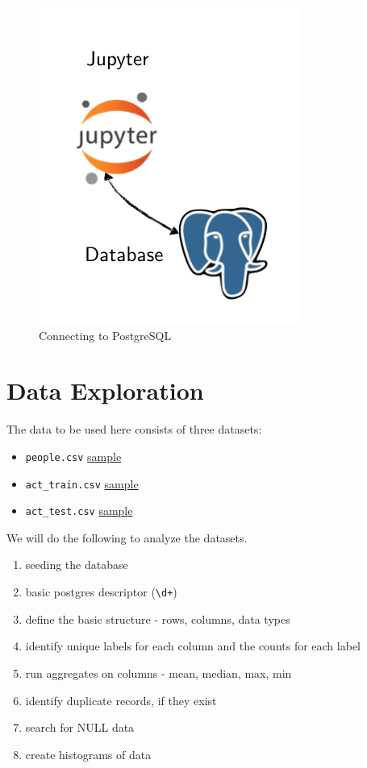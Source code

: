 \documentclass[]{report}
\begin{document}
\begin{figure}[htbp]
\centering
\includegraphics{assets/img/connecting_to_postgres.png}
\caption{Connecting to PostgreSQL}
\end{figure}

\pagebreak

\chapter{Data Exploration}\label{data-exploration}

The data to be used here consists of three datasets:

\begin{itemize}
\tightlist
\item
  \texttt{people.csv}
  \href{https://github.com/joshuacook/redhat/blob/master/data/people_head.csv}{sample}
\item
  \texttt{act\_train.csv}
  \href{https://github.com/joshuacook/redhat/blob/master/data/act_train_head.csv}{sample}
\item
  \texttt{act\_test.csv}
  \href{https://github.com/joshuacook/redhat/blob/master/data/act_test_head.csv}{sample}
\end{itemize}

We will do the following to analyze the datasets.

\begin{enumerate}
\def\labelenumi{\arabic{enumi}.}
\tightlist
\item
  seeding the database
\item
  basic postgres descriptor (\texttt{\textbackslash{}d+})
\item
  define the basic structure - rows, columns, data types
\item
  identify unique labels for each column and the counts for each label
\item
  run aggregates on columns - mean, median, max, min
\item
  identify duplicate records, if they exist
\item
  search for NULL data
\item
  create histograms of data
\end{enumerate}
\end{document}
